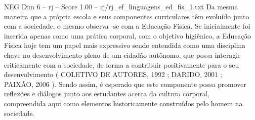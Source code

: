 \begin{textsample}{NEG Dim 6 – rj – Score 1.00 – rj/rj\_ef\_linguagens\_ed\_fis\_1.txt}
Da mesma maneira que a própria escola e seus componentes curriculares têm evoluído junto com a sociedade, o mesmo observa -se com a Educação Física.
Se inicialmente foi inserida apenas como uma prática corporal, com o objetivo higiênico, a Educação Física hoje tem um papel mais expressivo sendo entendida como uma disciplina chave no desenvolvimento pleno de um cidadão autônomo, que possa interagir criticamente com a sociedade, de forma a contribuir positivamente para o seu desenvolvimento ( COLETIVO DE AUTORES, 1992 ; DARIDO, 2001 ; PAIXÃO, 2006 ).
Sendo assim, é esperado que este componente possa promover reflexões e diálogos junto aos estudantes acerca da cultura corporal, compreendida aqui como elementos historicamente construídos pelo homem na sociedade.

\end{textsample}

